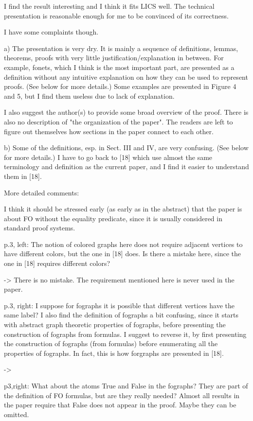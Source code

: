 I find the result interesting and I think it fits LICS well.
The technical presentation is reasonable enough for me to be convinced of its correctness.

I have some complaints though.

a) The presentation is very dry.
It is mainly a sequence of definitions, lemmas, theorems, proofs with very little justification/explanation in between.
For example, fonets, which I think is the most important part, are presented as a definition without any intuitive explanation
on how they can be used to represent proofs. (See below for more details.)
Some examples are presented in Figure 4 and 5, but I find them useless due to lack of explanation.

I also suggest the author(s) to provide some broad overview of the proof.
There is also no description of "the organization of the paper".
The readers are left to figure out themselves how sections in the paper connect to each other.

b) Some of the definitions, esp. in Sect. III and IV, are very confusing.
(See below for more details.)
I have to go back to [18] which use almost the same terminology and definition as the current paper,
and I find it easier to understand them in [18].

More detailed comments:

I think it should be stressed early (as early as in the abstract) that the paper is about FO without the equality predicate,
since it is usually considered in standard proof systems.

p.3, left: The notion of colored graphs here does not require adjacent vertices to have different colors, but the one in [18] does.
Is there a mistake here, since the one in [18] requires different colors?

-> There is no mistake. The requirement mentioned here is never used in the
paper.

p.3, right: I suppose for fographs it is possible that different vertices have the same label?
I also find the definition of fographs a bit confusing, since it starts with abstract graph theoretic properties of fographs,
before presenting the construction of fographs from formulas.
I suggest to reverse it, by first presenting the construction of fographs (from formulas) before enumerating all the properties of fographs.
In fact, this is how forgraphs are presented in [18].

->

p3,right: What about the atoms True and False in the fographs?
They are part of the definition of FO formulas, but are they really needed?
Almost all results in the paper require that False does not appear in the proof.
Maybe they can be omitted.

